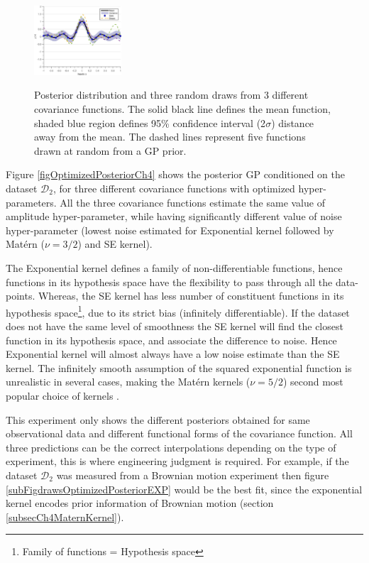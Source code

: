 \begin{figure}[!h]
  {
        \includegraphics[width=0.29\textwidth]
        {images/part2/drawsPosteriorSE}
        \label{subFigdrawsPosteriorSE}
  }\quad
\caption{Posterior distribution and three random draws from 3 different covariance functions. The solid black line defines the mean function, shaded blue region defines 95\% confidence interval (2$\sigma$) distance away from the mean. The dashed lines represent five functions drawn at random from a GP prior. }
       \label{figpreOptimizedPosteriorCh5}
\end{figure}

\begin{mdframed}[hidealllines=true,backgroundcolor=lightgray!20]
Figure \ref{figOptimizedPosteriorCh4} shows the posterior GP conditioned on the dataset $\mathcal{D}_{2}$, for three different covariance functions with optimized hyper-parameters. All the three covariance functions estimate the same value of amplitude hyper-parameter, while having significantly different value of noise hyper-parameter (lowest noise estimated for Exponential kernel followed by Mat\'ern ($\nu=3/2$) and SE kernel). 

The Exponential kernel defines a family of non-differentiable functions, hence functions in its hypothesis space have the flexibility to pass through all the data-points. Whereas, the SE kernel has less number of constituent functions in its hypothesis space\footnote{Family of functions = Hypothesis space}, due to its strict bias (infinitely differentiable). If the dataset does not have the same level of smoothness the SE kernel will find the closest function in its hypothesis space, and associate the difference to noise. Hence Exponential kernel will almost always have a low noise estimate than the SE kernel. The infinitely smooth assumption of the squared exponential function is unrealistic in several cases, making the Mat\'ern kernels ($\nu=5/2$) second most popular choice of kernels \cite{stein2012interpolation, cornford2002modelling}. 

This experiment only shows the different posteriors obtained for same observational data and different functional forms of the covariance function. All three predictions can be the correct interpolations depending on the type of experiment, this is where engineering judgment is required. For example, if the dataset $\mathcal{D}_{2}$ was measured from a Brownian motion experiment then figure \ref{subFigdrawsOptimizedPosteriorEXP} would be the best fit, since the exponential kernel encodes prior information of Brownian motion (section \ref{subsecCh4MaternKernel}).

\end{mdframed}


